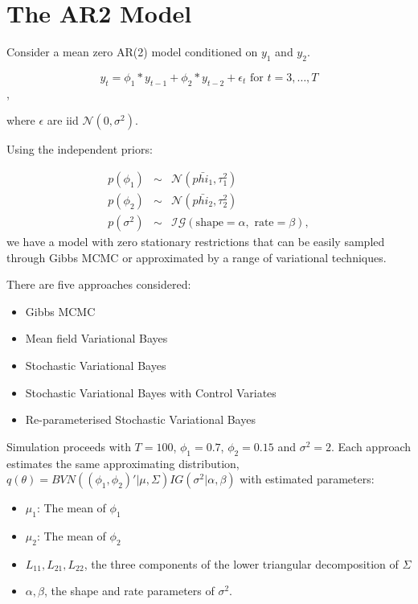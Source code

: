 \documentclass{article}
\begin{document}


\section{The AR2 Model}

Consider a mean zero AR(2) model conditioned on $y_1$ and $y_2$.

$$y_t = \phi_1 * y_{t-1} + \phi_2 * y_{t-2} + \epsilon_t \mbox{ for } t = 3,\dots,T$$,

where $\epsilon$ are iid $\mathcal{N}(0, \sigma^2)$.

Using the independent priors: 

\begin{eqnarray*}
p(\phi_1) & \sim & \mathcal{N}(\bar{phi_1}, \tau_{1}^2) \\
p(\phi_2) & \sim & \mathcal{N}(\bar{phi_2}, \tau_{2}^2) \\
p(\sigma^2) & \sim & \mathcal{IG} (\mbox{shape} = \alpha, \mbox{ rate} = \beta),
\end{eqnarray*}
we have a model with zero stationary restrictions that can be easily sampled through Gibbs MCMC or approximated by a range of variational techniques.

There are five approaches considered:

\begin{itemize}
\item Gibbs MCMC
\item Mean field Variational Bayes
\item Stochastic Variational Bayes
\item Stochastic Variational Bayes with Control Variates
\item Re-parameterised Stochastic Variational Bayes
\end{itemize}

Simulation proceeds with $T = 100$, $\phi_1 = 0.7$, $\phi_2 = 0.15$ and $\sigma^2 = 2$. Each approach estimates the same approximating distribution, $q(\theta) = BVN((\phi_1, \phi_2)' | \mu, \Sigma) IG(\sigma^2 | \alpha, \beta)$ with estimated parameters:

\begin{itemize}
\item $\mu_1$: The mean of $\phi_1$
\item $\mu_2$: The mean of $\phi_2$
\item $L_{11}, L_{21}, L_{22}$, the three components of the lower triangular decomposition of $\Sigma$
\item $\alpha, \beta$, the shape and rate parameters of $\sigma^2$.
\end{itemize}
\end{document}
